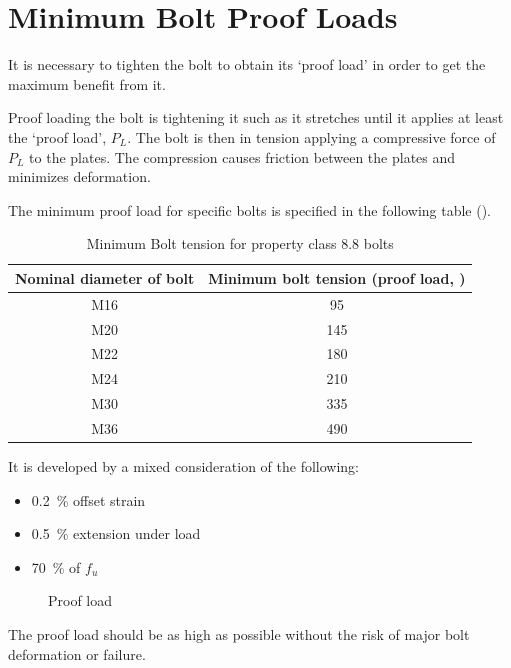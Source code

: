 \section{Minimum Bolt Proof Loads}
It is necessary to tighten the bolt to obtain its `proof load' in order to get the maximum benefit from it.

Proof loading the bolt is tightening it such as it stretches until it applies at least the `proof load', $P_L$. The bolt is then in tension applying a compressive force of $P_L$ to the plates. The compression causes friction between the plates and minimizes deformation.

The minimum proof load for specific bolts is specified in the following table ().
\begin{table}[H]\centering\footnotesize\caption{Minimum Bolt tension for property class 8.8 bolts}
\begin{tabular}{cc}
	\toprule
	Nominal diameter of bolt & Minimum bolt tension (proof load, \si{\kn}) \\ \midrule
	          M16            &                     95                      \\
	          M20            &                     145                     \\
	          M22            &                     180                     \\
	          M24            &                     210                     \\
	          M30            &                     335                     \\
	          M36            &                     490                     \\ \bottomrule
\end{tabular}
\end{table}
It is developed by a mixed consideration of the following:
\begin{itemize}
\item \SI{0.2}{\percent} offset strain
\item \SI{0.5}{\percent} extension under load
\item \SI{70}{\percent} of $f_u$
\end{itemize}
\begin{figure}[H]
\centering
\caption{Proof load}
\end{figure}

The proof load should be as high as possible without the risk of major bolt deformation or failure.

